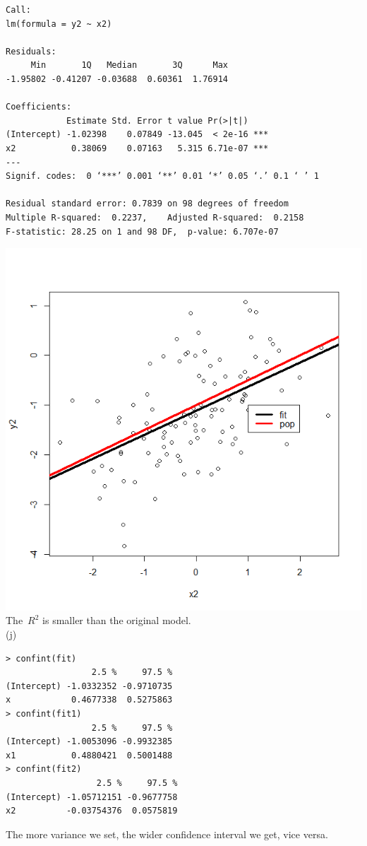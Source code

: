 \documentclass[12pt]{article}
\begin{document}
\begin{itemize}
\begin{verbatim}
Call:
lm(formula = y2 ~ x2)

Residuals:
     Min       1Q   Median       3Q      Max
-1.95802 -0.41207 -0.03688  0.60361  1.76914

Coefficients:
            Estimate Std. Error t value Pr(>|t|)
(Intercept) -1.02398    0.07849 -13.045  < 2e-16 ***
x2           0.38069    0.07163   5.315 6.71e-07 ***
---
Signif. codes:  0 ‘***’ 0.001 ‘**’ 0.01 ‘*’ 0.05 ‘.’ 0.1 ‘ ’ 1

Residual standard error: 0.7839 on 98 degrees of freedom
Multiple R-squared:  0.2237,	Adjusted R-squared:  0.2158
F-statistic: 28.25 on 1 and 98 DF,  p-value: 6.707e-07
\end{verbatim}
\raggedright{\includegraphics[width=0.7\linewidth]{high}}\\
The\ $R^2$ is smaller than the original model.\\[3ex]
(j)
\begin{verbatim}
> confint(fit)
                 2.5 %     97.5 %
(Intercept) -1.0332352 -0.9710735
x            0.4677338  0.5275863
> confint(fit1)
                 2.5 %     97.5 %
(Intercept) -1.0053096 -0.9932385
x1           0.4880421  0.5001488
> confint(fit2)
                  2.5 %     97.5 %
(Intercept) -1.05712151 -0.9677758
x2          -0.03754376  0.0575819
\end{verbatim}
The more variance we set, the wider confidence interval we get, vice versa.
\end{itemize}
\end{document}
